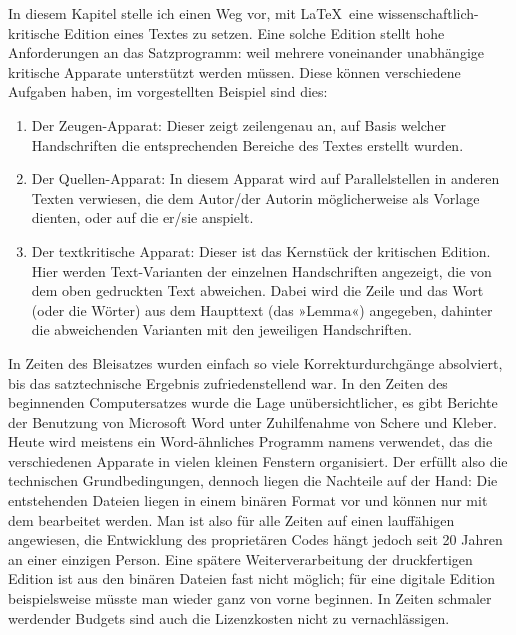 In diesem Kapitel stelle ich einen Weg vor, mit \LaTeX\ eine wissenschaftlich-kritische Edition eines Textes zu setzen. Eine solche Edition stellt hohe Anforderungen an das Satzprogramm: weil mehrere voneinander unabhängige kritische Apparate unterstützt werden müssen. Diese können verschiedene Aufgaben haben, im vorgestellten Beispiel sind dies:

\begin{enumerate}\label{pil:apparat}
\item Der Zeugen-Apparat: Dieser zeigt zeilengenau an, auf Basis welcher Handschriften die entsprechenden Bereiche des Textes erstellt wurden.

\item Der Quellen-Apparat: In diesem Apparat wird auf Parallelstellen in anderen Texten verwiesen, die dem Autor/der Autorin 
möglicherweise als Vorlage dienten, oder auf die er/sie anspielt.

\item Der textkritische Apparat: Dieser ist das Kernstück der kritischen Edition. Hier werden Text-Varianten der einzelnen Handschriften angezeigt, die von dem oben gedruckten Text 
abweichen. 
Dabei wird die Zeile und das 
Wort (oder die Wörter) aus dem Haupttext (das »Lemma«) angegeben, dahinter die 
abweichenden Varianten mit den jeweiligen Handschriften.
\end{enumerate}

In Zeiten des Bleisatzes wurden einfach so viele Korrekturdurchgänge absolviert, 
bis das satztechnische Ergebnis zufriedenstellend war. In den Zeiten des beginnenden 
Computersatzes wurde die Lage unübersichtlicher, es gibt Berichte der 
Benutzung von Microsoft Word unter 
Zuhilfenahme von Schere und Kleber.~\cite[34]{stockhausen:mde2016/2} Heute wird meistens 
ein Word-ähnliches Programm namens  verwendet, 
das die verschiedenen Apparate in vielen kleinen Fenstern organisiert. 
Der  erfüllt also die technischen Grundbedingungen, dennoch liegen die 
Nachteile auf der Hand: Die entstehenden Dateien liegen in einem binären Format 
vor und können nur mit dem  bearbeitet werden. 
Man ist also für alle Zeiten auf einen lauffähigen  angewiesen, 
die Entwicklung des proprietären Codes hängt jedoch seit 20 Jahren an einer einzigen Person.
Eine spätere Weiterverarbeitung der druckfertigen Edition ist aus den binären Dateien 
fast nicht möglich; für eine digitale Edition beispielsweise müsste man wieder ganz von vorne beginnen.
In Zeiten schmaler werdender Budgets sind auch die Lizenzkosten nicht zu vernachlässigen.

